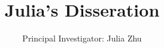 \documentclass[12pt,letterpaper]{article}
\begin{document}
\title{Julia's Disseration}
\author{Principal Investigator: Julia Zhu \\
}
\newpage


\setcounter{page}{1}


\setcounter{page}{1}



\setcounter{page}{1} 


\setcounter{page}{1} 


\setcounter{page}{1}


\setcounter{page}{1}
   


% 
% 
% 
% 
% 
\end{document}
